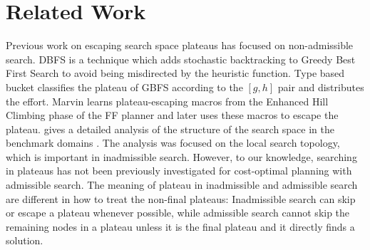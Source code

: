 \section{Related Work}
\label{sec-4}

Previous work on escaping search space plateaus has focused on
non-admissible search.  DBFS \cite{imai2011novel} is a technique which
adds stochastic backtracking to Greedy Best First Search to avoid
being misdirected by the heuristic function. Type based bucket
\cite{xie14type} classifies the plateau of GBFS according to the
$[g,h]$ pair and distributes the effort.  Marvin \cite{Coles07} learns plateau-escaping macros
from the Enhanced Hill Climbing phase of the FF planner
\cite{Hoffmann01} and later uses these macros to escape the plateau.
\citeauthor{Hoffmann05} gives a detailed analysis of the
structure of the search space in the benchmark domains 
\cite{Hoffmann05,Hoffmann14}. 
The analysis was focused on the local search topology, which is
important in inadmissible search.
% 
However, to our knowledge, searching in plateaus has not been
previously investigated for cost-optimal planning with admissible
search.
The meaning of plateau in inadmissible and admissible search are
different in how to treat the non-final plateaus: Inadmissible search can
skip or escape a plateau whenever possible, while
admissible search cannot skip the remaining nodes in a plateau unless it
is the final plateau and it directly finds a solution.


